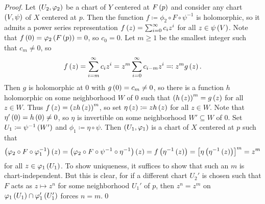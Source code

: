 \documentclass[../Moduli_Spaces_of_Riemann_Surfaces.tex]{subfiles}
\begin{document}
    \begin{proof}
        Let $\left(U_2,\varphi_2\right)$ be a chart of $Y$ centered at $F\left(p\right)$ and consider any chart $\left(V,\psi\right)$ of $X$ centered at $p$. Then the function $f\coloneqq\phi_2\circ F\circ\psi^{-1}$ is holomorphic, so it admits a power series representation $f\left(z\right)=\sum_{i=0}^{\infty}c_iz^i$ for all $z\in\psi\left(V\right)$. Note that $f\left(0\right)=\varphi_2\left(F\left(p\right)\right)=0$, so $c_0=0$. Let $m\geq1$ be the smallest integer such that $c_m\neq0$, so
        \begin{equation*}
            f\left(z\right)=\sum_{i=m}^{\infty}c_iz^i=z^m\sum_{i=0}^{\infty}c_{i-m}z^i\eqqcolon z^mg\left(z\right).
        \end{equation*}
        Then $g$ is holomorphic at $0$ with $g\left(0\right)=c_m\neq0$, so there is a function $h$ holomorphic on some neighborhood $W$ of $0$ such that $\left(h\left(z\right)\right)^m=g\left(z\right)$ for all $z\in W$. Thus $f\left(z\right)=\left(zh\left(z\right)\right)^m$, so set $\eta\left(z\right)\coloneqq zh\left(z\right)$ for all $z\in W$. Note that $\eta'\left(0\right)=h\left(0\right)\neq0$, so $\eta$ is invertible on some neighborhood $W'\subseteq W$ of $0$. Set $U_1\coloneqq\psi^{-1}\left(W'\right)$ and $\phi_1\coloneqq\eta\circ\psi$. Then $\left(U_1,\varphi_1\right)$ is a chart of $X$ centered at $p$ such that
        \begin{equation*}
            \left(\varphi_2\circ F\circ\varphi_1^{-1}\right)\left(z\right)=\left(\varphi_2\circ F\circ\psi^{-1}\circ\eta^{-1}\right)\left(z\right)=f\left(\eta^{-1}\left(z\right)\right)=\left[\eta\left(\eta^{-1}\left(z\right)\right)\right]^m=z^m
        \end{equation*}
        for all $z\in\varphi_1\left(U_1\right)$. To show uniqueness, it suffices to show that such an $m$ is chart-independent. But this is clear, for if a different chart $U_2'$ is chosen such that $F$ acts as $z\mapsto z^n$ for some neighborhood $U_1'$ of $p$, then $z^n=z^m$ on $\varphi_1\left(U_1\right)\cap\varphi_1'\left(U_1'\right)$ forces $n=m$.\qed
    \end{proof}
\end{document}
